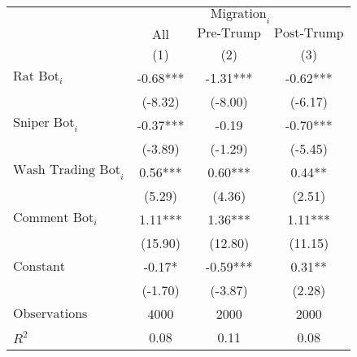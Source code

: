 \begin{tabular}{lccc}
\toprule
 & \multicolumn{3}{c}{$\text{Migration}_{i}$} \\
\cline{2-4}
 & $\text{All}$ & $\text{Pre-Trump}$ & $\text{Post-Trump}$\\
 & (1) & (2) & (3)\\
\midrule
$\text{Rat Bot}_{i}$ & -0.68*** & -1.31*** & -0.62*** \\
 & (-8.32) & (-8.00) & (-6.17) \\
$\text{Sniper Bot}_{i}$ & -0.37*** & -0.19 & -0.70*** \\
 & (-3.89) & (-1.29) & (-5.45) \\
$\text{Wash Trading Bot}_{i}$ & 0.56*** & 0.60*** & 0.44** \\
 & (5.29) & (4.36) & (2.51) \\
$\text{Comment Bot}_{i}$ & 1.11*** & 1.36*** & 1.11*** \\
 & (15.90) & (12.80) & (11.15) \\
$\text{Constant}$ & -0.17* & -0.59*** & 0.31** \\
 & (-1.70) & (-3.87) & (2.28) \\
\midrule
$\text{Observations}$ & 4000 & 2000 & 2000 \\
$R^2$ & 0.08 & 0.11 & 0.08 \\
\bottomrule
\end{tabular}